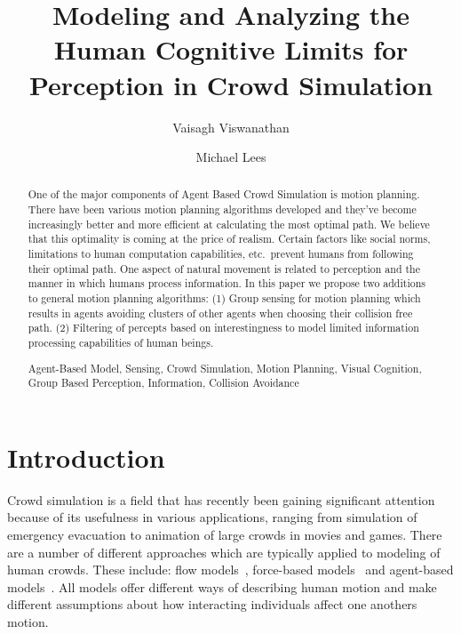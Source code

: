 \documentclass[runningheads,a4paper]{llncs}
\newcommand{\keywords}[1]{\par\addvspace\baselineskip
\noindent\keywordname\enspace\ignorespaces#1}
\begin{document}
%
\title{Modeling and Analyzing the Human Cognitive Limits for Perception in Crowd Simulation}


\author{Vaisagh Viswanathan \and Michael Lees}

\maketitle


\begin{abstract}
One of the major components of Agent Based Crowd Simulation is motion planning. There have been various motion planning algorithms developed and they've become increasingly better and more efficient at calculating the most optimal path. We believe that this optimality is coming at the price of realism. Certain factors like social norms, limitations to human computation capabilities, etc.\ prevent humans from following their optimal path. One aspect of natural movement is related to perception and the manner in which humans process information. In this paper we propose two additions to general motion planning algorithms: (1) Group sensing for motion planning which results in agents avoiding clusters of other agents when choosing their collision free path. (2) Filtering of percepts based on interestingness to model limited information processing capabilities of human beings.
\keywords{Agent-Based Model, Sensing, Crowd Simulation, Motion Planning, Visual Cognition, Group Based Perception, Information, Collision Avoidance}
\end{abstract}


\section{Introduction}
\label{intro}
Crowd simulation is a field that has recently been gaining significant attention because of its usefulness in various applications, ranging from simulation of emergency evacuation to animation of large crowds in movies and games. There are a number of different approaches which are typically applied to modeling of human crowds. These include: flow models~\cite{Klupfel:2005to}, force-based models~\cite{Helbing:2000ef}  and agent-based models~\cite{Luo:2008gj}. All models offer different ways of describing human motion and make different assumptions about how interacting individuals affect one anothers motion.
\end{document}
